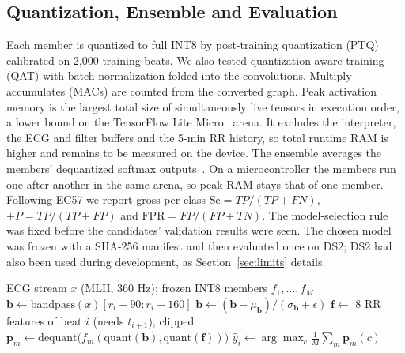 \documentclass[conference]{IEEEtran}
\begin{document}
\subsection{Quantization, Ensemble and Evaluation}
Each member is quantized to full INT8 by post-training quantization (PTQ)~\cite{jacob2018quantization} calibrated on 2,000 training beats. We also tested quantization-aware training (QAT) with batch normalization folded into the convolutions. Multiply-accumulates (MACs) are counted from the converted graph. Peak activation memory is the largest total size of simultaneously live tensors in execution order, a lower bound on the TensorFlow Lite Micro~\cite{david2021tflm} arena. It excludes the interpreter, the ECG and filter buffers and the 5-min RR history, so total runtime RAM is higher and remains to be measured on the device. The ensemble averages the members' dequantized softmax outputs~\cite{lakshminarayanan2017ensembles}. On a microcontroller the members run one after another in the same arena, so peak RAM stays that of one member. Following EC57 we report gross per-class $\mathrm{Se}=TP/(TP+FN)$, $+P=TP/(TP+FP)$ and $\mathrm{FPR}=FP/(FP+TN)$. The model-selection rule was fixed before the candidates' validation results were seen. The chosen model was frozen with a SHA-256 manifest and then evaluated once on DS2; DS2 had also been used during development, as Section~\ref{sec:limits} details.

\begin{algorithm}[t]
\caption{Per-beat inference on the device (one-beat delay)}
\label{alg:infer}
\small
\begin{algorithmic}[1]
\Require ECG stream $x$ (MLII, 360 Hz); frozen INT8 members $f_1,\dots,f_M$
 
  \State $\mathbf{b} \gets \mathrm{bandpass}(x)[r_i-90 : r_i+160]$ 
  \State $\mathbf{b} \gets (\mathbf{b}-\mu_{\mathbf{b}})/(\sigma_{\mathbf{b}}+\epsilon)$
  \State $\mathbf{f} \gets$ 8 RR features of beat $i$ (needs $t_{i+1}$), clipped
    \State $\mathbf{p}_m \gets \mathrm{dequant}\big(f_m(\mathrm{quant}(\mathbf{b}), \mathrm{quant}(\mathbf{f}))\big)$
  \EndFor
  \State $\hat{y}_i \gets \arg\max_c \frac{1}{M}\sum_{m} \mathbf{p}_m(c)$ 
\EndFor
\end{algorithmic}
\end{algorithm}
\end{document}
